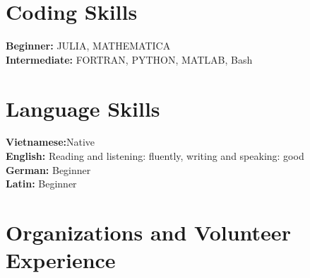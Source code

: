 \documentclass[letterpaper,11pt]{article}
\newcommand{\resumeSubHeadingListStart}{\begin{itemize}[leftmargin=0.15in, label={}]}
\newcommand{\resumeSubHeadingListEnd}{\end{itemize}}
\begin{document}
\section{Coding Skills}
\vspace{2pt}
\resumeSubHeadingListStart
\small{\item{
		\textbf{Beginner:}{ JULIA, MATHEMATICA} \\ \vspace{3pt}
		\textbf{Intermediate:}{ FORTRAN, PYTHON, MATLAB, Bash}
		
		
}}
\resumeSubHeadingListEnd




\section{Language Skills}
\vspace{2pt}
\resumeSubHeadingListStart
\small{\item{
		\textbf{Vietnamese:}{Native} \\ \vspace{3pt}
		\textbf{English:}{ Reading and listening: fluently, writing and speaking: good}\\ \vspace{3pt}
		\textbf{German:}{ Beginner} \\ \vspace{3pt}
		\textbf{Latin:}{ Beginner}
		
		
}}
\resumeSubHeadingListEnd
	 \section{Organizations and Volunteer Experience}
\end{document}
